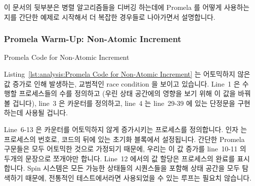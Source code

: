 이 문서의 뒷부분은 병렬 알고리즘들을 디버깅 하는데에 Promela 를 어떻게
사용하는지를 간단한 예제로 시작해서 더 복잡한 경우들로 나아가면서 설명합니다.
\iffalse

The above site also gives links to Gerard Holzmann's excellent
book~\cite{Holzmann03a} on Promela and Spin,
as well as searchable online references starting at:
\url{http://www.spinroot.com/spin/Man/index.html}.

The remainder of this section describes how to use Promela to debug
parallel algorithms, starting with simple examples and progressing to
more complex uses.
\fi

\subsubsection{Promela Warm-Up: Non-Atomic Increment}
\label{sec:formal:Promela Warm-Up: Non-Atomic Increment}

\begin{listing}[tbp]

\caption{Promela Code for Non-Atomic Increment}
\label{lst:formal:Promela Code for Non-Atomic Increment}
\end{listing}

Listing~\ref{lst:analysis:Promela Code for Non-Atomic Increment}
는 어토믹하지 않은 값 증가로 인해 발생하는, 교범적인 race condition 을 보이고
있습니다.
Line~1 은 수행할 프로세스들의 수를 정의하고 (우린 상태 공간에의 영향을 보기
위해 이 값을 바꿔볼 겁니다), line~3 은 카운터를 정의하고, line~4 는 line~29-39
에 있는 단정문을 구현하는데 사용될 겁니다.

Line~6-13 은 카운터를 어토믹하지 않게 증가시키는 프로세스를 정의합니다.
인자  는 프로세스의 번호로, 코드의 뒤에 있는 초기화 블록에서 설정됩니다.
간단한 Promela 구문들은 모두 어토믹한 것으로 가정되기 때문에, 우리는 이 값
증가를 line~10-11 의 두개의 문장으로 쪼개야만 합니다.
Line~12 에서의 값 할당은 프로세스의 완료를 표시합니다.
Spin 시스템은 모든 가능한 상태들의 시퀀스들을 포함해 상태 공간을 모두 탐색하기
때문에, 전통적인 테스트에서라면 사용되었을 수 있는 루프는 필요치 않습니다.
\iffalse

